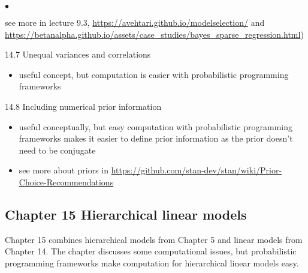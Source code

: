 \documentclass[a4paper,11pt]{article}
\begin{document}
\begin{list}{$\bullet$}{\parsep=0pt\itemsep=2pt}
\begin{itemize}
    see more in lecture 9.3,
    \url{https://avehtari.github.io/modelselection/} and
    \url{https://betanalpha.github.io/assets/case_studies/bayes_sparse_regression.html})
  \end{itemize}
\item[14.7] Unequal variances and correlations
  \begin{itemize}
  \item useful concept, but computation is easier with probabilistic
    programming frameworks
  \end{itemize}
\item[14.8] Including numerical prior information
  \begin{itemize}
  \item useful conceptually, but easy computation with probabilistic
    programming frameworks makes it easier to define prior information
    as the prior doesn't need to be conjugate
  \item see more about priors in \url{https://github.com/stan-dev/stan/wiki/Prior-Choice-Recommendations}
  \end{itemize}
\end{list}

\subsection*{Chapter 15 Hierarchical linear models}

Chapter 15 combines hierarchical models from Chapter 5 and linear
models from Chapter 14. The chapter discusses some computational
issues, but probabilistic programming frameworks make computation for
hierarchical linear models easy.  
\end{document}
